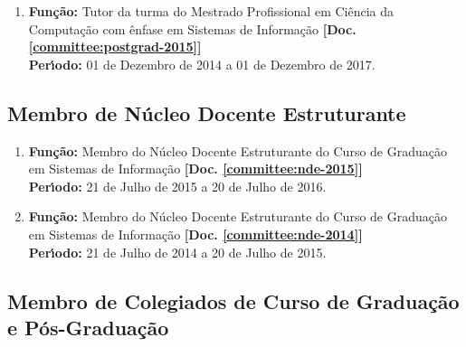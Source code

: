 \documentclass[a4paper,oneside,10pt]{article}
\begin{document}
\begin{enumerate}
\renewcommand{\labelenumi}{{\large\bfseries\arabic{enumi}.}}

\item   \textbf{Fun\c{c}\~{a}o:} Tutor da turma do Mestrado Profissional em Ciência da Computação com ênfase em Sistemas de Informação \textbf{[Doc. \ref{committee:postgrad-2015}]}\\
        \textbf{Per\'{\i}odo:} 01 de Dezembro de 2014 a 01 de Dezembro de 2017.

\end{enumerate}


\subsection{Membro de Núcleo Docente Estruturante}
\vspace{0.3cm}

\begin{enumerate}
\renewcommand{\labelenumi}{{\large\bfseries\arabic{enumi}.}}

\item   \textbf{Fun\c{c}\~{a}o:} Membro do Núcleo Docente Estruturante do Curso de Graduação em Sistemas de Informação \textbf{[Doc. \ref{committee:nde-2015}]}\\
        \textbf{Per\'{\i}odo:} 21 de Julho de 2015 a 20 de Julho de 2016.

\item   \textbf{Fun\c{c}\~{a}o:} Membro do Núcleo Docente Estruturante do Curso de Graduação em Sistemas de Informação \textbf{[Doc. \ref{committee:nde-2014}]}\\
        \textbf{Per\'{\i}odo:} 21 de Julho de 2014 a 20 de Julho de 2015.

\end{enumerate}


\subsection{Membro de Colegiados de Curso de Gradua\c{c}\~{a}o e P\'{o}s-Gradua\c{c}\~{a}o}
\vspace{0.3cm}
\end{document}
